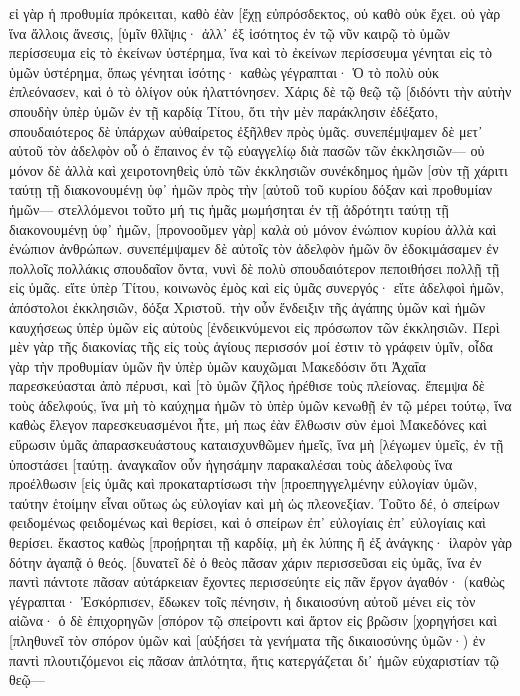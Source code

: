 εἰ γὰρ ἡ προθυμία πρόκειται, καθὸ ἐὰν [ἔχῃ εὐπρόσδεκτος, οὐ καθὸ οὐκ ἔχει. 
οὐ γὰρ ἵνα ἄλλοις ἄνεσις, [ὑμῖν θλῖψις· ἀλλ᾽ ἐξ ἰσότητος 
ἐν τῷ νῦν καιρῷ τὸ ὑμῶν περίσσευμα εἰς τὸ ἐκείνων ὑστέρημα, ἵνα καὶ τὸ ἐκείνων περίσσευμα γένηται εἰς τὸ ὑμῶν ὑστέρημα, ὅπως γένηται ἰσότης· 
καθὼς γέγραπται· Ὁ τὸ πολὺ οὐκ ἐπλεόνασεν, καὶ ὁ τὸ ὀλίγον οὐκ ἠλαττόνησεν. 
Χάρις δὲ τῷ θεῷ τῷ [διδόντι τὴν αὐτὴν σπουδὴν ὑπὲρ ὑμῶν ἐν τῇ καρδίᾳ Τίτου, 
ὅτι τὴν μὲν παράκλησιν ἐδέξατο, σπουδαιότερος δὲ ὑπάρχων αὐθαίρετος ἐξῆλθεν πρὸς ὑμᾶς. 
συνεπέμψαμεν δὲ μετ᾽ αὐτοῦ τὸν ἀδελφὸν οὗ ὁ ἔπαινος ἐν τῷ εὐαγγελίῳ διὰ πασῶν τῶν ἐκκλησιῶν— 
οὐ μόνον δὲ ἀλλὰ καὶ χειροτονηθεὶς ὑπὸ τῶν ἐκκλησιῶν συνέκδημος ἡμῶν [σὺν τῇ χάριτι ταύτῃ τῇ διακονουμένῃ ὑφ᾽ ἡμῶν πρὸς τὴν [αὐτοῦ τοῦ κυρίου δόξαν καὶ προθυμίαν ἡμῶν— 
στελλόμενοι τοῦτο μή τις ἡμᾶς μωμήσηται ἐν τῇ ἁδρότητι ταύτῃ τῇ διακονουμένῃ ὑφ᾽ ἡμῶν, 
[προνοοῦμεν γὰρ] καλὰ οὐ μόνον ἐνώπιον κυρίου ἀλλὰ καὶ ἐνώπιον ἀνθρώπων. 
συνεπέμψαμεν δὲ αὐτοῖς τὸν ἀδελφὸν ἡμῶν ὃν ἐδοκιμάσαμεν ἐν πολλοῖς πολλάκις σπουδαῖον ὄντα, νυνὶ δὲ πολὺ σπουδαιότερον πεποιθήσει πολλῇ τῇ εἰς ὑμᾶς. 
εἴτε ὑπὲρ Τίτου, κοινωνὸς ἐμὸς καὶ εἰς ὑμᾶς συνεργός· εἴτε ἀδελφοὶ ἡμῶν, ἀπόστολοι ἐκκλησιῶν, δόξα Χριστοῦ. 
τὴν οὖν ἔνδειξιν τῆς ἀγάπης ὑμῶν καὶ ἡμῶν καυχήσεως ὑπὲρ ὑμῶν εἰς αὐτοὺς [ἐνδεικνύμενοι εἰς πρόσωπον τῶν ἐκκλησιῶν. 
Περὶ μὲν γὰρ τῆς διακονίας τῆς εἰς τοὺς ἁγίους περισσόν μοί ἐστιν τὸ γράφειν ὑμῖν, 
οἶδα γὰρ τὴν προθυμίαν ὑμῶν ἣν ὑπὲρ ὑμῶν καυχῶμαι Μακεδόσιν ὅτι Ἀχαΐα παρεσκεύασται ἀπὸ πέρυσι, καὶ [τὸ ὑμῶν ζῆλος ἠρέθισε τοὺς πλείονας. 
ἔπεμψα δὲ τοὺς ἀδελφούς, ἵνα μὴ τὸ καύχημα ἡμῶν τὸ ὑπὲρ ὑμῶν κενωθῇ ἐν τῷ μέρει τούτῳ, ἵνα καθὼς ἔλεγον παρεσκευασμένοι ἦτε, 
μή πως ἐὰν ἔλθωσιν σὺν ἐμοὶ Μακεδόνες καὶ εὕρωσιν ὑμᾶς ἀπαρασκευάστους καταισχυνθῶμεν ἡμεῖς, ἵνα μὴ [λέγωμεν ὑμεῖς, ἐν τῇ ὑποστάσει [ταύτῃ. 
ἀναγκαῖον οὖν ἡγησάμην παρακαλέσαι τοὺς ἀδελφοὺς ἵνα προέλθωσιν [εἰς ὑμᾶς καὶ προκαταρτίσωσι τὴν [προεπηγγελμένην εὐλογίαν ὑμῶν, ταύτην ἑτοίμην εἶναι οὕτως ὡς εὐλογίαν καὶ μὴ ὡς πλεονεξίαν. 
Τοῦτο δέ, ὁ σπείρων φειδομένως φειδομένως καὶ θερίσει, καὶ ὁ σπείρων ἐπ᾽ εὐλογίαις ἐπ᾽ εὐλογίαις καὶ θερίσει. 
ἕκαστος καθὼς [προῄρηται τῇ καρδίᾳ, μὴ ἐκ λύπης ἢ ἐξ ἀνάγκης· ἱλαρὸν γὰρ δότην ἀγαπᾷ ὁ θεός. 
[δυνατεῖ δὲ ὁ θεὸς πᾶσαν χάριν περισσεῦσαι εἰς ὑμᾶς, ἵνα ἐν παντὶ πάντοτε πᾶσαν αὐτάρκειαν ἔχοντες περισσεύητε εἰς πᾶν ἔργον ἀγαθόν· 
(καθὼς γέγραπται· Ἐσκόρπισεν, ἔδωκεν τοῖς πένησιν, ἡ δικαιοσύνη αὐτοῦ μένει εἰς τὸν αἰῶνα· 
ὁ δὲ ἐπιχορηγῶν [σπόρον τῷ σπείροντι καὶ ἄρτον εἰς βρῶσιν [χορηγήσει καὶ [πληθυνεῖ τὸν σπόρον ὑμῶν καὶ [αὐξήσει τὰ γενήματα τῆς δικαιοσύνης ὑμῶν·) 
ἐν παντὶ πλουτιζόμενοι εἰς πᾶσαν ἁπλότητα, ἥτις κατεργάζεται δι᾽ ἡμῶν εὐχαριστίαν τῷ θεῷ— 
